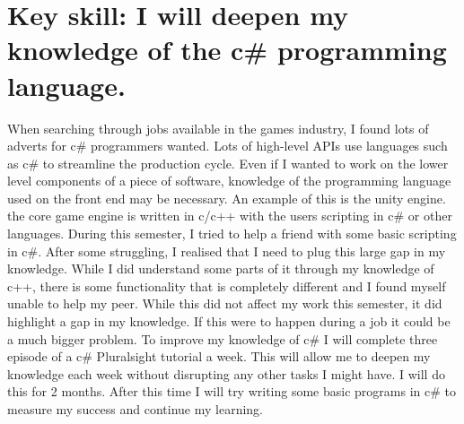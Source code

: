 \documentclass{scrartcl}
\begin{document}
\section{Key skill: I will deepen my knowledge of the c\# programming language.}
When searching through jobs available in the games industry, I found lots of adverts for c\# programmers wanted. Lots of high-level APIs use languages such as c\# to streamline the production cycle. Even if I wanted to work on the lower level components of a piece of software, knowledge of the programming language used on the front end may be necessary. An example of this is the unity engine. the core game engine is written in c/c++ with the users scripting in c\# or other languages. During this semester, I tried to help a friend with some basic scripting in c\#. After some struggling, I realised that I need to plug this large gap in my knowledge. While I did understand some parts of it through my knowledge of c++, there is some functionality that is completely different and I found myself unable to help my peer. While this did not affect my work this semester, it did highlight a gap in my knowledge. If this were to happen during a job it could be a much bigger problem. To improve my knowledge of c\# I will complete three episode of a c\# Pluralsight tutorial a week. This will allow me to deepen my knowledge each week without disrupting any other tasks I might have. I will do this for 2 months. After this time I will try writing some basic programs in c\# to measure my success and continue my learning.

\section{}



\end{document}
